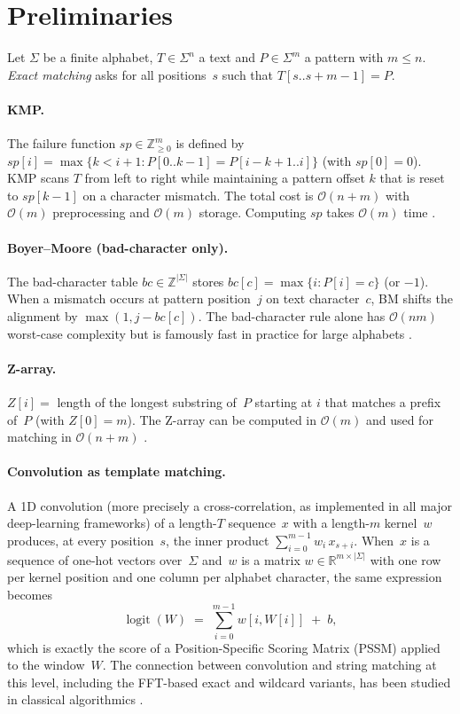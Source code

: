 \documentclass[11pt,a4paper]{article}
\newcommand{\sigmaalph}{\Sigma}
\newcommand{\bigO}[1]{\mathcal{O}(#1)}
\begin{document}
\section{Preliminaries}
\label{sec:prelim}

Let $\sigmaalph$ be a finite alphabet, $T \in \sigmaalph^n$ a text and
$P \in \sigmaalph^m$ a pattern with $m \le n$. \emph{Exact matching}
asks for all positions~$s$ such that $T[s..s+m-1] = P$.

\paragraph{KMP.}
The failure function $sp \in \mathbb{Z}^m_{\ge 0}$ is defined by
$sp[i] = \max\{k < i+1 : P[0..k-1] = P[i-k+1..i]\}$ (with $sp[0]=0$).
KMP scans $T$ from left to right while maintaining a pattern offset $k$
that is reset to $sp[k-1]$ on a character mismatch. The total cost is
$\bigO{n+m}$ with $\bigO{m}$ preprocessing and $\bigO{m}$ storage.
Computing $sp$ takes $\bigO{m}$ time \cite{KMP1977,Gusfield1997}.

\paragraph{Boyer--Moore (bad-character only).}
The bad-character table $bc \in \mathbb{Z}^{|\sigmaalph|}$ stores
$bc[c] = \max\{i : P[i] = c\}$ (or $-1$). When a mismatch occurs at
pattern position~$j$ on text character~$c$, BM shifts the alignment by
$\max(1, j - bc[c])$. The bad-character rule alone has $\bigO{nm}$
worst-case complexity but is famously fast in practice for large
alphabets \cite{BoyerMoore1977}.

\paragraph{Z-array.}
$Z[i] = $ length of the longest substring of~$P$ starting at $i$ that
matches a prefix of~$P$ (with $Z[0]=m$). The Z-array can be computed in
$\bigO{m}$ and used for matching in $\bigO{n+m}$ \cite{Gusfield1997}.

\paragraph{Convolution as template matching.}
A 1D convolution (more precisely a cross-correlation, as implemented in
all major deep-learning frameworks) of a length-$T$ sequence~$x$ with a
length-$m$ kernel~$w$ produces, at every position~$s$, the
inner product $\sum_{i=0}^{m-1} w_i\,x_{s+i}$. When~$x$ is a sequence of
one-hot vectors over~$\sigmaalph$ and~$w$ is a matrix
$w \in \mathbb{R}^{m \times |\sigmaalph|}$ with one row per kernel
position and one column per alphabet character, the same expression
becomes
\begin{equation}
\operatorname{logit}(W) \;=\; \sum_{i=0}^{m-1} w[i, W[i]] \;+\; b,
\label{eq:logit-basic}
\end{equation}
which is exactly the score of a Position-Specific Scoring Matrix (PSSM)
applied to the window~$W$. The connection between convolution and
string matching at this level, including the FFT-based exact and
wildcard variants, has been studied in classical algorithmics
\cite{CliffordClifford2007}.
\end{document}

